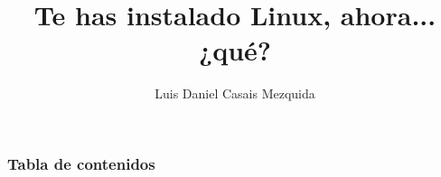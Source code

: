 \documentclass[aspectratio=43]{beamer}
\title{Te has instalado Linux, ahora... ¿qué?} %
\author{Luis Daniel Casais Mezquida} %
\institute{\edicion \ Jornadas Técnicas del GUL}
\date{\fecha}
\begin{document}
{
    \begin{frame}
        \titlepage
    \end{frame}
}
\addtocounter{framenumber}{-1}



\begin{frame}
    \frametitle{Tabla de contenidos}
    \tableofcontents
\end{frame}



\begin{frame}
    \frametitle{}

\end{frame}
\end{document}
